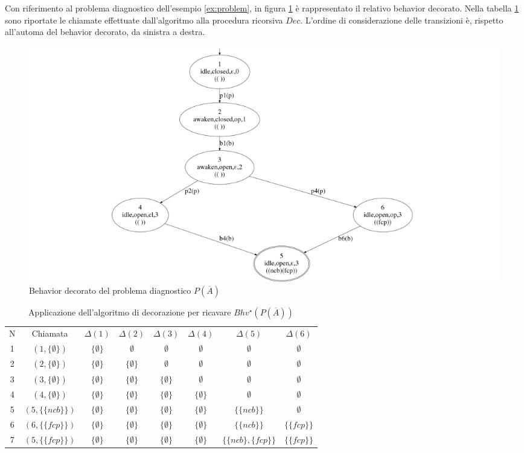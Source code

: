 \begin{ex}
Con riferimento al problema diagnostico dell'esempio \ref{ex:problem}, in figura \ref{fig:bhv_star} è rappresentato il relativo behavior decorato.
Nella tabella \ref{tab:decoration} sono riportate le chiamate effettuate dall'algoritmo alla procedura ricorsiva $Dec$. L'ordine di considerazione delle transizioni è, rispetto all'automa del behavior decorato, da sinistra a destra.
\end{ex}

\begin{figure}[htbp]
\centering
\includegraphics[scale=0.15]{./Img/sa/bhv_star.png}
\caption{Behavior decorato del problema diagnostico $P(\overline{A})$}
\label{fig:bhv_star}
\end{figure}

\begin{table}[htbp] 
\begin{tabularx}{\textwidth}{c c c c c c c c}
\hline
N & Chiamata & $\Delta(1)$ & $\Delta(2)$ & $\Delta(3)$ & $\Delta(4)$ & $\Delta(5)$ & $\Delta(6)$\\
1 & $(1,\{\emptyset\})$ & $\{\emptyset\}$  & $\emptyset$ & $\emptyset$ & $\emptyset$ & $\emptyset$ & $\emptyset$\\
2 & $(2,\{\emptyset\})$ & $\{\emptyset\}$  & $\{\emptyset\}$ & $\emptyset$ & $\emptyset$ & $\emptyset$ & $\emptyset$\\
3 & $(3,\{\emptyset\})$ & $\{\emptyset\}$  & $\{\emptyset\}$ & $\{\emptyset\}$ & $\emptyset$ & $\emptyset$ & $\emptyset$\\
4 & $(4,\{\emptyset\})$ & $\{\emptyset\}$  & $\{\emptyset\}$ & $\{\emptyset\}$ & $\{\emptyset\}$ & $\emptyset$ & $\emptyset$\\
5 & $(5,\{\{\mathit{ncb}\}\})$ & $\{\emptyset\}$  & $\{\emptyset\}$ & $\{\emptyset\}$ & $\{\emptyset\}$ & $\{\{\mathit{ncb}\}\}$ & $\emptyset$\\
6 & $(6,\{\{\mathit{fcp}\}\})$ & $\{\emptyset\}$  & $\{\emptyset\}$ & $\{\emptyset\}$ & $\{\emptyset\}$ & $\{\{\mathit{ncb}\}\}$ & $\{\{\mathit{fcp}\}\}$\\
7 & $(5,\{\{\mathit{fcp}\}\})$ & $\{\emptyset\}$  & $\{\emptyset\}$ & $\{\emptyset\}$ & $\{\emptyset\}$ & $\{\{\mathit{ncb}\},\{\mathit{fcp}\}\}$ & $\{\{\mathit{fcp}\}\}$\\
\hline
\end{tabularx}
\caption{Applicazione dell'algoritmo di decorazione per ricavare $Bhv^\star(P(\overline{A}))$}
\label{tab:decoration}
\end{table}


